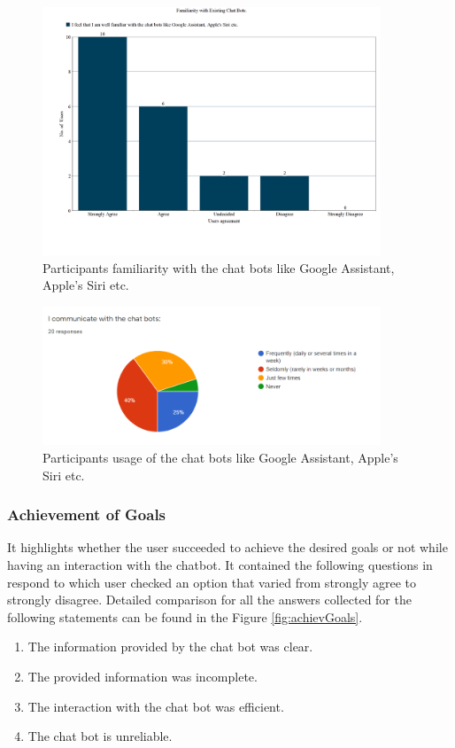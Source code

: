 \begin{figure}[!h]
    \centering
    \includegraphics[width=0.9\textwidth]{img/Familiraity_Updated.PNG}
    \caption{Participants familiarity with the chat bots like Google Assistant, Apple's Siri etc.}
    \label{fig:familiarity}
\end{figure}

\begin{figure}[!h]
    \centering
    \includegraphics[width=0.9\textwidth]{img/Communicate_Chatbots_Result.PNG}
    \caption{Participants usage of the chat bots like Google Assistant, Apple's Siri etc.}
    \label{fig:commChatRes}
\end{figure}

\subsubsection*{Achievement of Goals}
It highlights whether the user succeeded to achieve the desired goals or not while having an interaction with the chatbot. It contained the following questions in respond to which user checked an option that varied from strongly agree to strongly disagree. Detailed comparison for all the answers collected for the following statements can be found in the Figure \ref{fig:achievGoals}.
\begin{enumerate}
    \item The information provided by the chat bot was clear.
    \item The provided information was incomplete.
    \item The interaction with the chat bot was efficient.
    \item The chat bot is unreliable.
\end{enumerate}

